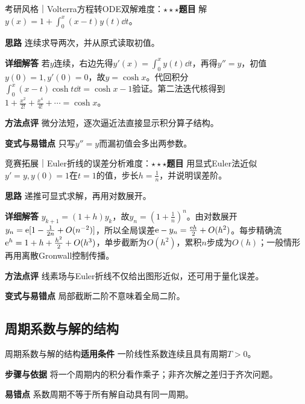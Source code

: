 \begin{example}{考研风格｜Volterra方程转ODE双解}{难度：$\star\star\star$}\label{deep:ex:ode_source_deep:volterra}\textbf{题目} 解$y(x)=1+\int_0^x(x-t)y(t)\dd t$。\par\textbf{思路} 连续求导两次，并从原式读取初值。\par\textbf{详细解答} 若$y$连续，右边先得$y'(x)=\int_0^xy(t)\dd t$，再得$y''=y$，初值$y(0)=1,y'(0)=0$，故$y=\cosh x$。代回积分$\int_0^x(x-t)\cosh t\dd t=\cosh x-1$验证。第二法迭代核得到$1+\frac{x^2}{2!}+\frac{x^4}{4!}+\cdots=\cosh x$。\par\textbf{方法点评} 微分法短，逐次逼近法直接显示积分算子结构。\par\textbf{变式与易错点} 只写$y''=y$而漏初值会多出两参数。\end{example}

\begin{example}{竞赛拓展｜Euler折线的误差分析}{难度：$\star\star\star$}\label{deep:ex:ode_source_deep:eulerscheme}\textbf{题目} 用显式Euler法近似$y'=y,y(0)=1$在$t=1$的值，步长$h=\frac{1}{n}$，并说明误差阶。\par\textbf{思路} 递推可显式求解，再用对数展开。\par\textbf{详细解答} $y_{k+1}=(1+h)y_k$，故$y_n=(1+\frac{1}{n})^n$。由对数展开$y_n=\mathrm{e}[1-\frac{1}{2n}+O(n^{-2})]$，所以全局误差$\mathrm{e}-y_n=\frac{\mathrm{e} h}{2}+O(h^2)$。每步精确流$\mathrm{e}^h=1+h+\frac{h^2}{2}+O(h^3)$，单步截断为$O(h^2)$，累积$n$步成为$O(h)$；一般情形再用离散Gronwall控制传播。\par\textbf{方法点评} 线素场与Euler折线不仅给出图形近似，还可用于量化误差。\par\textbf{变式与易错点} 局部截断二阶不意味着全局二阶。\end{example}

\subsection{周期系数与解的结构}\label{deep:ode_source_deep:periodic}

\begin{method}{周期系数与解的结构}\textbf{适用条件} 一阶线性系数连续且具有周期$T>0$。\par\textbf{步骤与依据} 将一个周期内的积分看作乘子；非齐次解之差归于齐次问题。\par\textbf{易错点} 系数周期不等于所有解自动具有同一周期。\end{method}

